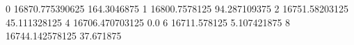 0 16870.775390625 164.3046875
1 16800.7578125 94.287109375
2 16751.58203125 45.111328125
4 16706.470703125 0.0
6 16711.578125 5.107421875
8 16744.142578125 37.671875
